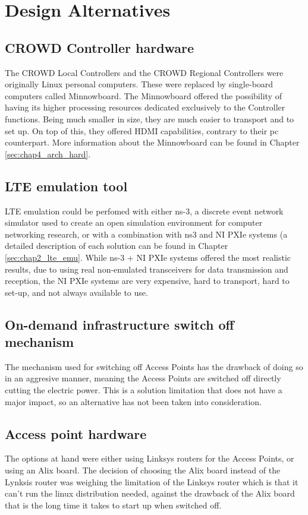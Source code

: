 \chapter{Design Alternatives}\label{chap:6}

\section{CROWD Controller hardware}\label{sec:chap6_ctrl}

The CROWD Local Controllers and the CROWD Regional Controllers were originally Linux personal computers. These were replaced by single-board computers called Minnowboard. The Minnowboard offered the possibility of having its higher processing resources dedicated exclusively to the Controller functions. Being much smaller in size, they are much easier to transport and to set up. On top of this, they offered HDMI capabilities, contrary to their pc counterpart. More information about the Minnowboard can be found in Chapter \ref{sec:chap4_arch_hard}.

\section{LTE emulation tool}\label{sec:chap6_lte}

LTE emulation could be perfomed with either ns-3, a discrete event network simulator used to create an open simulation environment for computer networking research, or with a combination with ns3 and NI PXIe systems (a detailed description of each solution can be found in Chapter \ref{sec:chap2_lte_emu}. While ns-3 + NI PXIe systems offered the most realistic results, due to using real non-emulated transceivers for data transmission and reception, the NI PXIe systems are very expensive, hard to transport, hard to set-up, and not always available to use.

\section{On-demand infrastructure switch off mechanism}\label{sec:chap6_switch}

The mechanism used for switching off Access Points has the drawback of doing so in an aggresive manner, meaning the Access Points are switched off directly cutting the electric power. This is a solution limitation that does not have a major impact, so an alternative has not been taken into consideration.

\section{Access point hardware}\label{sec:chap6_ap}

The options at hand were either using Linksys routers for the Access Points, or using an Alix board. The decision of choosing the Alix board instead of the Lynksis router was weighing the limitation of the Linksys router which is that it can't run the linux distribution needed, against the drawback of the Alix board that is the long time it takes to start up when switched off.
